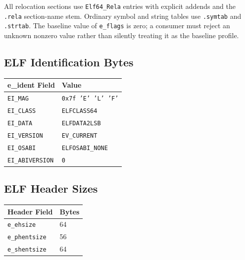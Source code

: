\documentclass[10pt,twoside]{article}
\begin{document}
All relocation sections use \texttt{Elf64\_Rela} entries with explicit
addends and the \texttt{.rela} section-name stem. Ordinary symbol and string
tables use \texttt{.symtab} and \texttt{.strtab}. The baseline value of
\texttt{e\_flags} is zero; a
consumer must reject an unknown nonzero value rather than silently treating it
as the baseline profile.

\subsection{ELF Identification Bytes}
\begingroup\footnotesize
\setlength{\tabcolsep}{2pt}
\begin{longtable}{@{}p{1.55in}p{3.95in}@{}}
\toprule
\textbf{e\_ident Field} & \textbf{Value}\\
\midrule
\endhead
\texttt{EI\_\allowbreak{}MAG} & \texttt{0x7f 'E' 'L' 'F'}\\
\texttt{EI\_\allowbreak{}CLASS} & \texttt{ELFCLASS64}\\
\texttt{EI\_\allowbreak{}DATA} & \texttt{ELFDATA2LSB}\\
\texttt{EI\_\allowbreak{}VERSION} & \texttt{EV\_\allowbreak{}CURRENT}\\
\texttt{EI\_\allowbreak{}OSABI} & \texttt{ELFOSABI\_\allowbreak{}NONE}\\
\texttt{EI\_\allowbreak{}ABIVERSION} & \texttt{0}\\
\bottomrule
\end{longtable}
\endgroup
\subsection{ELF Header Sizes}
\begingroup\footnotesize
\setlength{\tabcolsep}{2pt}
\begin{longtable}{@{}p{1.55in}p{3.95in}@{}}
\toprule
\textbf{Header Field} & \textbf{Bytes}\\
\midrule
\endhead
\texttt{e\_\allowbreak{}ehsize} & 64\\
\texttt{e\_\allowbreak{}phentsize} & 56\\
\texttt{e\_\allowbreak{}shentsize} & 64\\
\bottomrule
\end{longtable}
\endgroup
\end{document}
